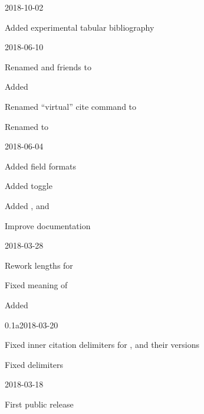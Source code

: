 \documentclass[DIV=9]{scrartcl}
\begin{document}
\begin{changelog}
\begin{release}{0.5}{2018-10-02}
  \item Added experimental tabular bibliography
\end{release}
\begin{release}{0.4}{2018-06-10}
  \item Renamed  and friends to
  \item Added 
  \item Renamed \enquote{virtual} cite command  to
  \item Renamed  to 
\end{release}
\begin{release}{0.3}{2018-06-04}
  \item Added 
    field formats
  \item Added  toggle%
  \item Added ,  and
  \item Improve documentation
\end{release}
\begin{release}{0.2}{2018-03-28}
  \item Rework lengths for 
  \item Fixed meaning of 
  \item Added 
\end{release}
\begin{release}{0.1a}{2018-03-20}
  \item Fixed inner citation delimiters for ,
     and their  versions%
  \item Fixed  delimiters
\end{release}
\begin{release}{0.1}{2018-03-18}
  \item First public release
\end{release}
\end{changelog}
\end{document}
